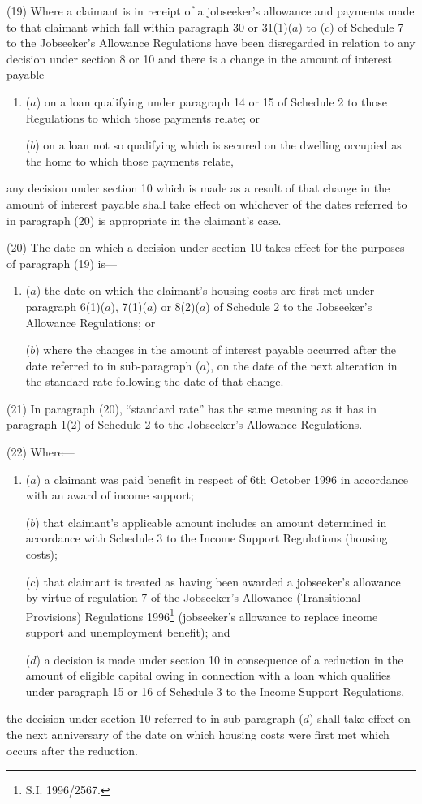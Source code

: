 \documentclass[12pt,a4paper]{article}
\begin{document}
(19) Where a claimant is in receipt of a jobseeker’s allowance and payments made to that claimant which fall within paragraph 30 or 31(1)($a$) to ($c$) of Schedule 7 to the Jobseeker’s Allowance Regulations have been disregarded in relation to any decision under section 8 or 10 and there is a change in the amount of interest payable—
\begin{enumerate}\item[]
($a$) on a loan qualifying under paragraph 14 or 15 of Schedule 2 to those Regulations to which those payments relate; or

($b$) on a loan not so qualifying which is secured on the dwelling occupied as the home to which those payments relate,
\end{enumerate}
any decision under section 10 which is made as a result of that change in the amount of interest payable shall take effect on whichever of the dates referred to in paragraph (20) is appropriate in the claimant’s case.

(20) The date on which a decision under section 10 takes effect for the purposes of paragraph (19) is—
\begin{enumerate}\item[]
($a$) the date on which the claimant’s housing costs are first met under paragraph 6(1)($a$), 7(1)($a$) or 8(2)($a$) of Schedule 2 to the Jobseeker’s Allowance Regulations; or

($b$) where the changes in the amount of interest payable occurred after the date referred to in sub-paragraph ($a$), on the date of the next alteration in the standard rate following the date of that change.
\end{enumerate}

(21) In paragraph (20), “standard rate” has the same meaning as it has in paragraph 1(2) of Schedule 2 to the Jobseeker’s Allowance Regulations.

(22) Where—
\begin{enumerate}\item[]
($a$) a claimant was paid benefit in respect of 6th October 1996 in accordance with an award of income support;

($b$) that claimant’s applicable amount includes an amount determined in accordance with Schedule 3 to the Income Support Regulations (housing costs);

($c$) that claimant is treated as having been awarded a jobseeker’s allowance by virtue of regulation 7 of the Jobseeker’s Allowance (Transitional Provisions) Regulations 1996\footnote{\frenchspacing S.I. 1996/2567.} (jobseeker’s allowance to replace income support and unemployment benefit); and

($d$) a decision is made under section 10 in consequence of a reduction in the amount of eligible capital owing in connection with a loan which qualifies under paragraph 15 or 16 of Schedule 3 to the Income Support Regulations,
\end{enumerate}
the decision under section 10 referred to in sub-paragraph ($d$) shall take effect on the next anniversary of the date on which housing costs were first met which occurs after the reduction.
\end{document}
